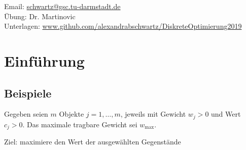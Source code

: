 
Email: \url{schwartz@gsc.tu-darmstadt.de}\\
Übung: Dr. Martinovic\\
Unterlagen: \url{www.github.com/alexandrabschwartz/DiskreteOptimierung2019}

\section{Einführung}
\subsection{Beispiele}
\begin{beispiel}[Rucksackproblem]\enter
	Gegeben seien $m$ Objekte $j=1,\dots,m$, jeweils mit Gewicht $w_{j}>0$ und Wert $c_{j}>0$. Das maximale tragbare Gewicht sei $w_{\max}$.

	Ziel: maximiere den Wert der ausgewählten Gegenstände
\end{beispiel}

